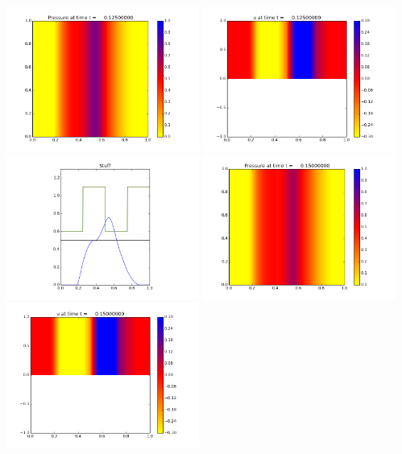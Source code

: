 \documentclass[11pt]{article}
\begin{document}
\vskip 10pt 
\includegraphics[width=0.475\textwidth]{frame0005fig0.png}
\includegraphics[width=0.475\textwidth]{frame0005fig1.png}
\vskip 10pt 
\includegraphics[width=0.475\textwidth]{frame0005fig3.png}
\vskip 10pt 
\includegraphics[width=0.475\textwidth]{frame0006fig0.png}
\includegraphics[width=0.475\textwidth]{frame0006fig1.png}
\end{document}
